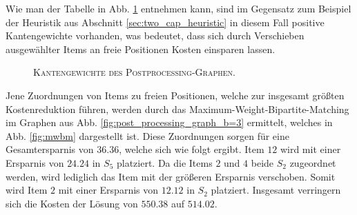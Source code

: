 Wie man der Tabelle in Abb. \ref{fig:post_processing_costs} entnehmen kann, sind im Gegensatz zum Beispiel
der Heuristik aus Abschnitt \ref{sec:two_cap_heuristic} in diesem Fall positive Kantengewichte vorhanden,
was bedeutet, dass sich durch Verschieben ausgewählter Items an freie Positionen Kosten einsparen lassen.

\begin{figure}[H]
\centering
{}
\caption{\textsc{Kantengewichte des Postprocessing-Graphen}.}
\label{fig:post_processing_costs}
\end{figure}

Jene Zuordnungen von Items zu freien Positionen, welche zur insgesamt größten Kostenreduktion führen, werden durch
das Maximum-Weight-Bipartite-Matching im Graphen aus Abb. \ref{fig:post_processing_graph_b=3} ermittelt,
welches in Abb. \ref{fig:mwbm} dargestellt ist.
Diese Zuordnungen sorgen für eine Gesamtersparnis von $36.36$, welche sich wie folgt ergibt.
Item $12$ wird mit einer Ersparnis von $24.24$ in $S_5$ platziert. Da die Items $2$ und $4$ beide $S_2$ zugeordnet werden,
wird lediglich das Item mit der größeren Ersparnis verschoben. Somit wird Item $2$ mit einer Ersparnis von $12.12$
in $S_2$ platziert. Insgesamt verringern sich die Kosten der Lösung von $550.38$ auf $514.02$.

